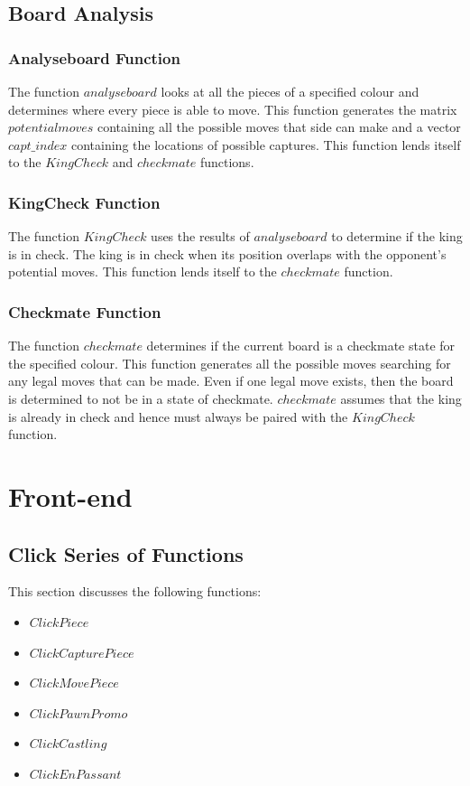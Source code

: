 \documentclass[11pt,a4paper]{article}
\begin{document}
\subsection{Board Analysis}
\subsubsection{Analyseboard Function}
The function $analyseboard$ looks at all the pieces of a specified colour and determines where every piece is able to move. This function generates the matrix $potentialmoves$ containing all the possible moves that side can make and a vector $capt\_index$ containing the locations of possible captures. 
This function lends itself to the $KingCheck$ and $checkmate$ functions.

\subsubsection{KingCheck Function}
The function $KingCheck$ uses the results of $analyseboard$ to determine if the king is in check. The king is in check when its position overlaps with the opponent’s potential moves. This function lends itself to the $checkmate$ function.

\subsubsection{Checkmate Function}
The function $checkmate$ determines if the current board is a checkmate state for the specified colour. This function generates all the possible moves searching for any legal moves that can be made. Even if one legal move exists, then the board is determined to not be in a state of checkmate.
\newline
$checkmate$ assumes that the king is already in check and hence must always be paired with the $KingCheck$ function.


\newpage
\section{Front-end}

\subsection{Click Series of Functions}

This section discusses the following functions: 
\begin{itemize}
\item $ClickPiece$
\item $ClickCapturePiece$
\item $ClickMovePiece$
\item $ClickPawnPromo$
\item $ClickCastling$
\item $ClickEnPassant$
\end{itemize}
\end{document}
